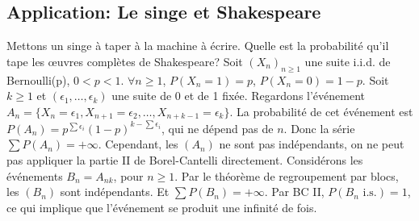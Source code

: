 \subsection{Application: Le singe et Shakespeare}
Mettons un singe à taper à la machine à écrire. Quelle est la probabilité qu'il tape les œuvres complètes de Shakespeare?
Soit $(X_n)_{n \ge 1}$ une suite i.i.d. de Bernoulli(p), $0 < p < 1$.
$\forall n \ge 1$, $P(X_n=1)=p$, $P(X_n=0)=1-p$.
Soit $k \ge 1$ et $(\epsilon_1, \dots, \epsilon_k)$ une suite de 0 et de 1 fixée.
Regardons l'événement $A_n = \{X_n=\epsilon_1, X_{n+1}=\epsilon_2, \dots, X_{n+k-1}=\epsilon_k\}$.
La probabilité de cet événement est $P(A_n) = p^{\sum \epsilon_i} (1-p)^{k-\sum \epsilon_i}$, qui ne dépend pas de $n$.
Donc la série $\sum P(A_n) = +\infty$.
Cependant, les $(A_n)$ ne sont pas indépendants, on ne peut pas appliquer la partie II de Borel-Cantelli directement.
Considérons les événements $B_n=A_{nk}$, pour $n \ge 1$. Par le théorème de regroupement par blocs, les $(B_n)$ sont indépendants.
Et $\sum P(B_n)=+\infty$. Par BC II, $P(B_n \text{ i.s.}) = 1$, ce qui implique que l'événement se produit une infinité de fois.
